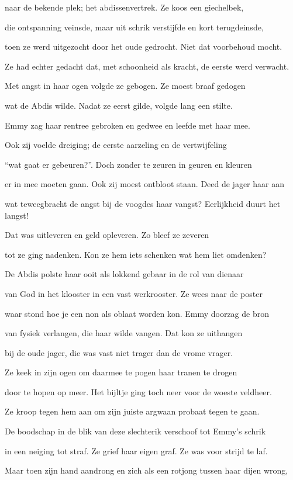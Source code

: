 naar de bekende plek;
het abdissenvertrek.
Ze koos een giechelbek,

die ontspanning veinsde,
maar uit schrik verstijfde
en kort terugdeinsde,

toen ze werd uitgezocht
door het oude gedrocht.
Niet dat voorbehoud mocht.

Ze had echter gedacht
dat, met schoonheid als kracht,
de eerste werd verwacht.

Met angst in haar ogen
volgde ze gebogen.
Ze moest braaf gedogen

wat de Abdis wilde.
Nadat ze eerst gilde,
volgde lang een stilte.

Emmy zag haar rentree
gebroken en gedwee
en leefde met haar mee.

Ook zij voelde dreiging;
de eerste aarzeling
en de vertwijfeling

“wat gaat er gebeuren?”.
Doch zonder te zeuren
in geuren en kleuren

er in mee moeten gaan.
Ook zij moest ontbloot staan.
Deed de jager haar aan

wat teweegbracht de angst
bij de voogdes haar vangst?
Eerlijkheid duurt het langst!

Dat was uitleveren
en geld opleveren.
Zo bleef ze zeveren

tot ze ging nadenken.
Kon ze hem iets schenken
wat hem liet omdenken?

De Abdis polste haar
ooit als lokkend gebaar
in de rol van dienaar

van God in het klooster
in een vast werkrooster.
Ze wees naar de poster

waar stond hoe je een non
als oblaat worden kon.
Emmy doorzag de bron

van fysiek verlangen,
die haar wilde vangen.
Dat kon ze uithangen

bij de oude jager,
die was vast niet trager
dan de vrome vrager.

Ze keek in zijn ogen
om daarmee te pogen
haar tranen te drogen

door te hopen op meer.
Het bijltje ging toch neer
voor de woeste veldheer.

Ze kroop tegen hem aan
om zijn juiste argwaan
probaat tegen te gaan.

De boodschap in de blik
van deze slechterik
verschoof tot Emmy’s schrik

in een neiging tot straf.
Ze grief haar eigen graf.
Ze was voor strijd te laf.

Maar toen zijn hand aandrong
en zich als een rotjong
tussen haar dijen wrong,

